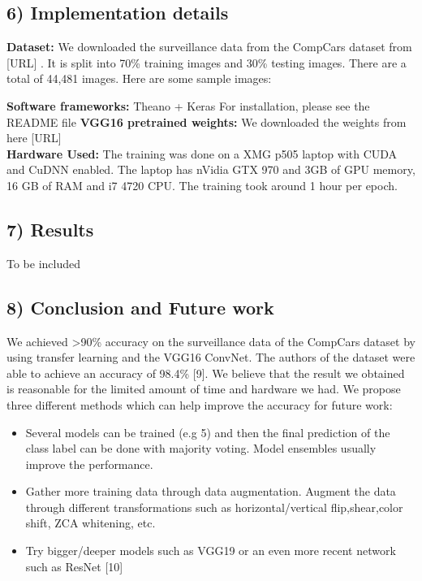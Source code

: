 \documentclass[a4paper]{article}
\begin{document}
\subsection*{6) Implementation details}
\begin{justify}
\flushleft
\textbf{Dataset:} We downloaded the surveillance data from the CompCars dataset from [URL] . It is split into 70\% training images and 30\% testing images. There are a total of 44,481 images. Here are some sample images:
   	\begin{tcolorbox}
   		\begin{figure}[H]
   			\begin{center}
   			\end{center}
   		\end{figure}
   	\end{tcolorbox}
   	
\textbf{Software frameworks:} Theano + Keras
For installation, please see the README file
\newline
\textbf{VGG16 pretrained weights:} We downloaded the weights from here [URL]
\newline
\\
\textbf{Hardware Used:} The training was done on a XMG p505 laptop with CUDA and CuDNN enabled. The laptop has nVidia GTX 970 and 3GB of GPU memory, 16 GB of RAM and i7 4720 CPU. The training took around 1 hour per epoch.

\end{justify}

\subsection*{7) Results}
To be included

\subsection*{8) Conclusion and Future work}
\begin{justify}
\flushleft
  We achieved >90\% accuracy on the surveillance data of the CompCars dataset by using transfer learning and the VGG16 ConvNet. The authors of the dataset were able to achieve an accuracy of 98.4\% [9]. We believe that the result we obtained is reasonable for the limited amount of time and hardware we had. We propose three different methods which can help improve the accuracy for future work:
  \begin{itemize}
  	\item Several models can be trained (e.g 5) and then the final prediction of the class label can be done with majority voting. Model ensembles usually improve the performance.
  	\item Gather more training data through data augmentation. Augment the data through different transformations such as horizontal/vertical flip,shear,color shift, ZCA whitening, etc.
  	\item Try bigger/deeper models such as VGG19 or an even more recent network such as ResNet [10]
  \end{itemize}
\end{justify}
\end{document}
